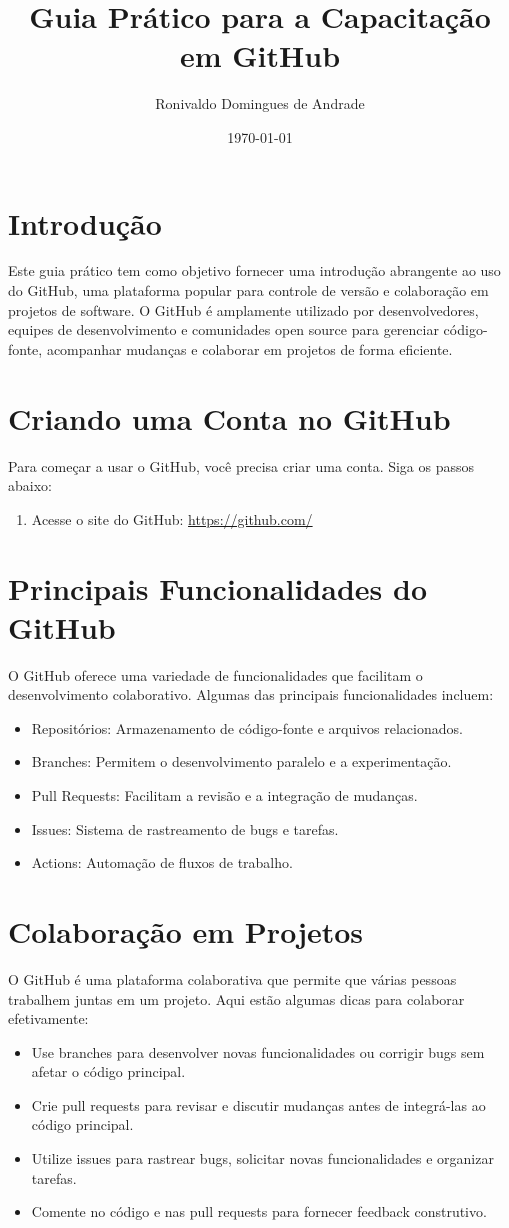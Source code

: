\documentclass{abntex2}
\title{Guia Prático para a Capacitação em GitHub}
\author{Ronivaldo Domingues de Andrade}
\date{\today}
\begin{document}
\maketitle
\newpage
\tableofcontents
\newpage
\section{Introdução}
Este guia prático tem como objetivo fornecer uma introdução abrangente ao uso do GitHub, uma plataforma popular para controle de versão e colaboração em projetos de software. O GitHub é amplamente utilizado por desenvolvedores, equipes de desenvolvimento e comunidades open source para gerenciar código-fonte, acompanhar mudanças e colaborar em projetos de forma eficiente.
\section{Criando uma Conta no GitHub}
Para começar a usar o GitHub, você precisa criar uma conta. Siga os passos abaixo:
\begin{enumerate}
    \item Acesse o site do GitHub: \url{https://github.com/}
\end{enumerate}
\section{Principais Funcionalidades do GitHub}
O GitHub oferece uma variedade de funcionalidades que facilitam o desenvolvimento colaborativo. Algumas das principais funcionalidades incluem:
\begin{itemize}
    \item Repositórios: Armazenamento de código-fonte e arquivos relacionados.
    \item Branches: Permitem o desenvolvimento paralelo e a experimentação.
    \item Pull Requests: Facilitam a revisão e a integração de mudanças.
    \item Issues: Sistema de rastreamento de bugs e tarefas.
    \item Actions: Automação de fluxos de trabalho.
\end{itemize}
\section{Colaboração em Projetos}
O GitHub é uma plataforma colaborativa que permite que várias pessoas trabalhem juntas em um projeto. Aqui estão algumas dicas para colaborar efetivamente:
\begin{itemize}
    \item Use branches para desenvolver novas funcionalidades ou corrigir bugs sem afetar o código principal.
    \item Crie pull requests para revisar e discutir mudanças antes de integrá-las ao código principal.
    \item Utilize issues para rastrear bugs, solicitar novas funcionalidades e organizar tarefas.
    \item Comente no código e nas pull requests para fornecer feedback construtivo.
\end{itemize}
\end{document}
